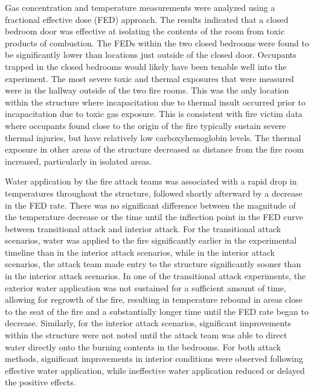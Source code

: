 \documentclass[12pt,oneside]{article}
\begin{document}
Gas concentration and temperature measurements were analyzed using a fractional effective dose (FED) approach. The results indicated that a closed bedroom door was effective at isolating the contents of the room from toxic products of combustion. The FEDs within the two closed bedrooms were found to be significantly lower than locations just outside of the closed door. Occupants trapped in the closed bedrooms would likely have been tenable well into the experiment. The most severe toxic and thermal exposures that were measured were in the hallway outside of the two fire rooms. This was the only location within the structure where incapacitation due to thermal insult occurred prior to incapacitation due to toxic gas exposure. This is consistent with fire victim data where occupants found close to the  origin of the fire typically sustain severe thermal injuries, but have relatively low carboxyhemoglobin levels. The thermal exposure in other areas of the structure decreased as distance from the fire room increased, particularly in isolated areas. 

Water application by the fire attack teams was associated with a rapid drop in temperatures throughout the structure, followed shortly afterward by a decrease in the FED rate. There was no significant difference between the magnitude of the temperature decrease or the time until the inflection point in the FED curve between transitional attack and interior attack. For the transitional attack scenarios, water was applied to the fire significantly earlier in the experimental timeline than in the interior attack scenarios, while in the interior attack scenarios, the attack team made entry to the structure significantly sooner than in the interior attack scenarios. In one of the transitional attack experiments, the exterior water application was not sustained for a sufficient amount of time, allowing for regrowth of the fire, resulting in temperature rebound in areas close to the seat of the fire and a substantially longer time until the FED rate began to decrease. Similarly, for the interior attack scenarios, significant improvements within the structure were not noted until the attack team was able to direct water directly onto the burning contents in the bedrooms. For both attack methods, significant improvements in  interior conditions were observed following effective water application, while ineffective water application reduced or delayed the positive effects.
\end{document}
